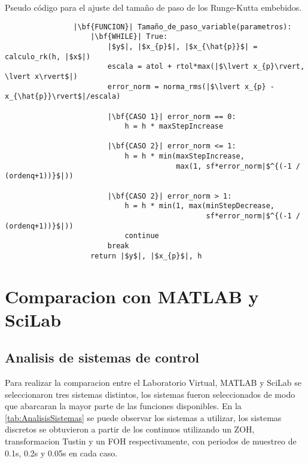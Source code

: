         \begin{longlisting}
            \caption[Pseudo código - Runge-Kutta embebidos]{Pseudo código para el ajuste del tamaño de paso de los Runge-Kutta embebidos.}
            \label{code:stepembebido}				
            \begin{verbatim}
                |\bf{FUNCION}| Tamaño_de_paso_variable(parametros):
                    |\bf{WHILE}| True:
                        |$y$|, |$x_{p}$|, |$x_{\hat{p}}$| = calculo_rk(h, |$x$|)
                        escala = atol + rtol*max(|$\lvert x_{p}\rvert, \lvert x\rvert$|)
                        error_norm = norma_rms(|$\lvert x_{p} - x_{\hat{p}}\rvert$|/escala)
                        
                        |\bf{CASO 1}| error_norm == 0:
                            h = h * maxStepIncrease
                        
                        |\bf{CASO 2}| error_norm <= 1:
                            h = h * min(maxStepIncrease,
                                        max(1, sf*error_norm|$^{(-1 / (ordenq+1))}$|))
                        
                        |\bf{CASO 2}| error_norm > 1:
                            h = h * min(1, max(minStepDecrease, 
                                               sf*error_norm|$^{(-1 / (ordenq+1))}$|))
                            continue
                        break
                    return |$y$|, |$x_{p}$|, h
            \end{verbatim}
        \end{longlisting}

\section{Comparacion con MATLAB y SciLab}

    \subsection{Analisis de sistemas de control}
        
        Para realizar la comparacion entre el Laboratorio Virtual, MATLAB y SciLab se seleccionaron tres sistemas distintos, los sistemas fueron seleccionados de modo que abarcaran la mayor parte de las funciones disponibles. En la \cref{tab:AnalisisSistemas} se puede observar los sistemas a utilizar, los sistemas discretos se obtuvieron a partir de los continuos utilizando un ZOH, transformacion Tustin y un FOH respectivamente, con periodos de muestreo de 0.1s, 0.2s y 0.05s en cada caso.

